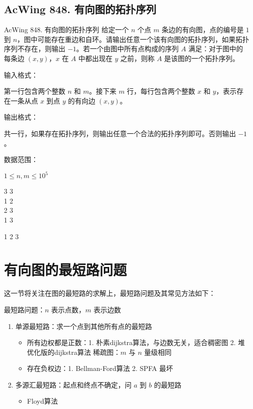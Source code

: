 \subsection{AcWing 848. 有向图的拓扑序列}
\begin{titledbox}{AcWing 848. 有向图的拓扑序列}
    给定一个 $n$ 个点 $m$ 条边的有向图，点的编号是 $1$ 到 $n$，图中可能存在重边和自环。请输出任意一个该有向图的拓扑序列，如果拓扑序列不存在，则输出 $-1$。若一个由图中所有点构成的序列 $A$ 满足：对于图中的每条边 $(x, y)$，$x$ 在 $A$ 中都出现在 $y$ 之前，则称 $A$ 是该图的一个拓扑序列。

    输入格式：

    第一行包含两个整数 $n$ 和 $m$。接下来 $m$ 行，每行包含两个整数 $x$ 和 $y$，表示存在一条从点 $x$ 到点 $y$ 的有向边 $(x, y)$。

    输出格式：

    共一行，如果存在拓扑序列，则输出任意一个合法的拓扑序列即可。否则输出 $-1$。

    数据范围：

    $1 \le n,m \le 10^5$

    \begin{inputblock}
        3 3 \\
        1 2 \\
        2 3 \\
        1 3 \\
    \end{inputblock}
    \begin{outputblock}
        1 2 3
    \end{outputblock}
\end{titledbox}


\section{有向图的最短路问题}
这一节将关注在图的最短路的求解上，最短路问题及其常见方法如下：

最短路问题：$n$ 表示点数，$m$ 表示边数

\begin{enumerate}
    \item 单源最短路：求一个点到其他所有点的最短路
    \begin{itemize}
        \item 所有边权都是正数：1. 朴素dijkstra算法，与边数无关，适合稠密图 2. 堆优化版的dijkstra算法  稀疏图：$m$ 与 $n$ 量级相同
        \item 存在负权边：1. Bellman-Ford算法  2. SPFA 最坏 
    \end{itemize}
    \item 多源汇最短路：起点和终点不确定，问 $a$ 到 $b$ 的最短路
    \begin{itemize}
        \item Floyd算法 
    \end{itemize}
\end{enumerate}

